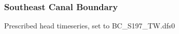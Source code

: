 %
%



\clearpage
\subsubsection{Southeast Canal Boundary}
Prescribed head timeseries, set to BC\_S197\_TW.dfs0%



